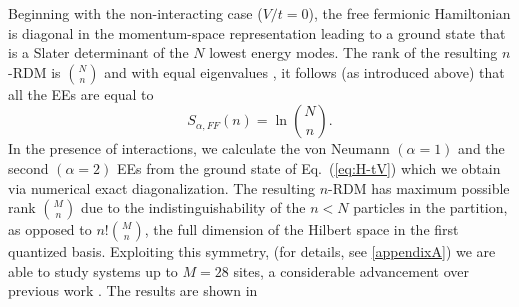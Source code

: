 Beginning with the non-interacting case ($V/t=0$), the free fermionic 
Hamiltonian is diagonal in the momentum-space representation leading to a
ground state that is a Slater determinant of the $N$ lowest energy modes. The
rank of the resulting $n$-RDM is $\binom{N}{n}$ and with equal eigenvalues
\cite{Zozulya:2008kb}, it follows (as introduced above) that all the \ren EEs are equal to   
%
\begin{equation}
S_{\alpha,FF}(n) =\ln{\binom{N}{n}}.
\label{S_FF_tV} 
\end{equation}
%
In the presence of interactions, we calculate the von Neumann $(\alpha=1)$ and
the second $(\alpha=2)$ \ren EEs from the ground state of Eq.~(\ref{eq:H-tV})
which we obtain via numerical exact diagonalization. The resulting $n$-RDM has
maximum possible rank $\binom{M}{n}$ due to the indistinguishability of the
$n<N$ particles in the partition, as opposed to $n!\binom{M}{n}$, the full
dimension of the Hilbert space in the first quantized basis.  Exploiting this
symmetry, (for details, see \ref{appendixA}) we are able to study systems up to
$M=28$ sites, a considerable advancement over previous work
\cite{Haque:2009df}.  The results are shown in 
%
